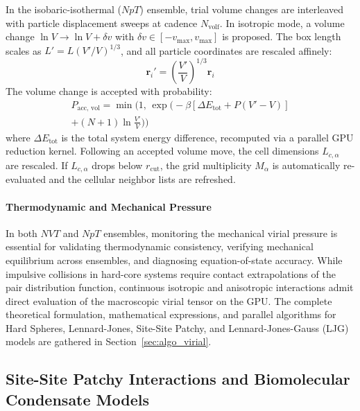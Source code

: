 \documentclass[final,5p,times,twocolumn]{elsarticle}
\begin{document}
In the isobaric-isothermal ($NpT$) ensemble, trial volume changes are
interleaved with particle displacement sweeps at cadence
$N_{\text{volf}}$. In isotropic mode, a volume change $\ln V \to \ln V
+ \delta v$ with $\delta v \in [-v_{\max}, v_{\max}]$ is proposed. The
box length scales as $L' = L (V'/V)^{1/3}$, and all particle
coordinates are rescaled affinely: 
\begin{equation}
    \mathbf{r}_i' = \left(\frac{V'}{V}\right)^{1/3} \mathbf{r}_i
\end{equation}
The volume change is accepted with probability:
\begin{multline}
    P_{\text{acc, vol}} = \min\Big(1, \, \exp\Big(-\beta \left[\Delta E_{\text{tot}} + P(V' - V)\right] \\
    + (N + 1)\ln\frac{V'}{V}\Big)\Big)
\end{multline}
where $\Delta E_{\text{tot}}$ is the total system energy difference,
recomputed via a parallel GPU reduction kernel. Following an accepted
volume move, the cell dimensions $L_{c,\alpha}$ are rescaled. If
$L_{c,\alpha}$ drops below $r_{\text{cut}}$, the grid multiplicity
$M_\alpha$ is automatically re-evaluated and the cellular neighbor
lists are refreshed. 

\paragraph{Thermodynamic and Mechanical Pressure}
In both $NVT$ and $NpT$ ensembles, monitoring the mechanical virial pressure is essential for validating thermodynamic consistency, verifying mechanical equilibrium across ensembles, and diagnosing equation-of-state accuracy. While impulsive collisions in hard-core systems require contact extrapolations of the pair distribution function, continuous isotropic and anisotropic interactions admit direct evaluation of the macroscopic virial tensor on the GPU. The complete theoretical formulation, mathematical expressions, and parallel algorithms for Hard Spheres, Lennard-Jones, Site-Site Patchy, and Lennard-Jones-Gauss (LJG) models are gathered in Section~\ref{sec:algo_virial}.

\subsection{Site-Site Patchy Interactions and Biomolecular Condensate Models}
\label{sec:algo_patchy_models}
\end{document}
